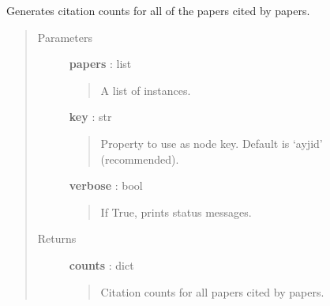 \documentclass[letterpaper,10pt,english]{sphinxmanual}
\begin{document}
\begin{fulllineitems}
\label{tethne.networks:tethne.networks.helpers.citation_count}
Generates citation counts for all of the papers cited by papers.
\begin{quote}\begin{description}
\item[{Parameters }] \leavevmode
\textbf{papers} : list
\begin{quote}

A list of {\hyperref[tethne:tethne.data.Paper]{}} instances.
\end{quote}

\textbf{key} : str
\begin{quote}

Property to use as node key. Default is `ayjid' (recommended).
\end{quote}

\textbf{verbose} : bool
\begin{quote}

If True, prints status messages.
\end{quote}

\item[{Returns }] \leavevmode
\textbf{counts} : dict
\begin{quote}

Citation counts for all papers cited by papers.
\end{quote}

\end{description}\end{quote}

\end{fulllineitems}

\end{document}
